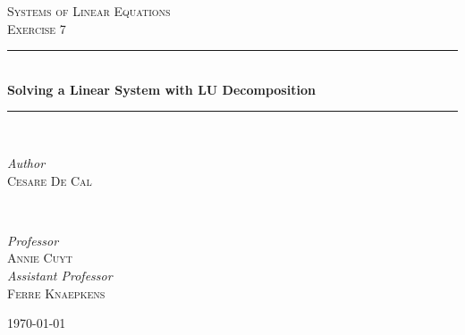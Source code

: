 \documentclass{article}
\begin{document}

\begin{titlepage} %
	\newcommand{\HRule}{\rule{\linewidth}{0.5mm}}%
	
	\center %
	
	
	\textsc{\Large Systems of Linear Equations}\\[0.5cm] %
	
	\textsc{\large Exercise 7}\\[0.5cm] %
	
	
	\HRule\\[0.6cm]
	
	{\huge\bfseries Solving a Linear System with LU Decomposition}\\[0.25cm] %
	
	\HRule\\[1.5cm]
	
	
	\begin{minipage}{0.4\textwidth}
		\begin{flushleft}
			\large
			\textit{Author}\\
			\textsc{Cesare De Cal} %
		\end{flushleft}
	\end{minipage}
	~
	\begin{minipage}{0.4\textwidth}
		\begin{flushright}
			\large
			\textit{Professor}\\
			\textsc{Annie Cuyt}\\ %
			[0.25cm]
			\textit{Assistant Professor}\\
			\textsc{Ferre Knaepkens} %

		\end{flushright}
	\end{minipage}
		
	\vfill\vfill\vfill
	
	{\large\today}
		
	\vfill
	
\end{titlepage}
\end{document}
